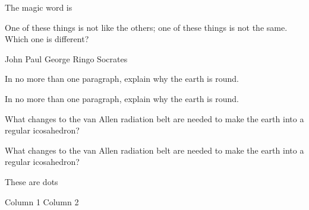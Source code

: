 \documentclass{exam}
\begin{document}
\newpage
	
The magic word is \fillin

\checkboxchar{$\Box$}

\begin{questions}
	\question One of these things is not like the others; one of these
	things is not the same. Which one is different?
	\begin{oneparcheckboxes}
		\choice John
		\choice Paul
		\choice George
		\choice Ringo
		\CorrectChoice Socrates
	\end{oneparcheckboxes}

\question
In no more than one paragraph, explain why the earth is round.
\makeemptybox{1in}


In no more than one paragraph, explain why the earth is round.

What changes to the van Allen radiation belt are needed to make
the earth into a regular icosahedron?
\fillwithlines{1in}

\setlength\linefillheight{.5in}

\question What changes to the van Allen radiation belt are needed to make
the earth into a regular icosahedron?

These are dots
\fillwithdottedlines{1in}

\begin{multicols}{2}
	Column 1
	\columnbreak
	Column 2
\end{multicols}


\end{questions}

\newpage
\end{document}
